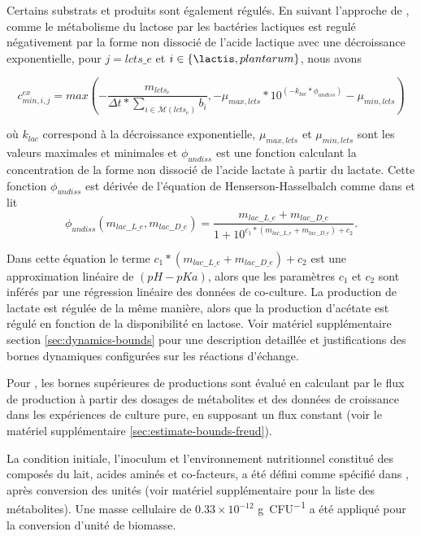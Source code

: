 \documentclass[../main.tex]{subfiles}
\begin{document}
Certains substrats et produits sont également régulés. En suivant l'approche de \citep{Ozcan.2020}, comme le métabolisme du lactose par les bactéries lactiques est regulé négativement par la forme non dissocié de l'acide lactique avec une décroissance exponentielle, pour $j=lcts\_e$ et $i \in \{\lactis, plantarum\}$, nous avons 

\[ c^{ex}_{min,i,j} = max(-\frac{m_{lcts_e}}{\Delta t*\sum_{i \in \mathcal{M}(lcts_e)} b_i},-\mu_{max,lcts}*10^{(-k_{lac}*\phi_{undiss})}-\mu_{min,lcts})\]  

où $k_{lac}$ correspond à la décroissance exponentielle, $\mu_{max,lcts}$ et $\mu_{min,lcts}$ sont les valeurs maximales et minimales et $\phi_{undiss}$ est une fonction calculant la concentration de la forme non dissocié de l'acide lactate à partir du lactate. Cette fonction $\phi_{undiss}$ est dérivée de l'équation de Henserson-Hasselbalch comme dans \citep{Ozcan.2020} et lit
\begin{equation}
\phi_{undiss}(m_{lac\_\_L\_e},m_{lac\_\_D\_e}) = \frac{m_{lac\_\_L\_e}+m_{lac\_\_D\_e}}{1+ 10^{c_1 * (m_{lac\_\_L\_e}+m_{lac\_\_D\_e})+c_2}}.
\label{eq:undissociated-lactate}
\end{equation}

Dans cette équation le terme $c_1 * (m_{lac\_\_L\_e}+m_{lac\_\_D\_e})+c_2$ est une approximation linéaire de $(pH-pKa)$, alors que les paramètres 
$c_1$ et $c_2$ sont inférés par une régression linéaire des données de co-culture. La production de lactate est régulée de la même manière, alors que la production d'acétate est régulé en fonction de la disponibilité en lactose. Voir matériel supplémentaire section \ref{sec:dynamics-bounds} pour une description detaillée et justifications des bornes dynamiques configurées sur les réactions d'échange.

Pour \freud, les bornes supérieures de productions sont évalué en calculant par le flux de production à partir des dosages de métabolites et des données de croissance dans les expériences de culture pure, en supposant un flux constant (voir le matériel supplémentaire \ref{sec:estimate-bounds-freud}).

La condition initiale, l'inoculum et l'environnement nutritionnel constitué des composés du lait, acides aminés et co-facteurs, a été défini comme spécifié dans \citep{Cao2021}, après conversion des unités (voir matériel supplémentaire pour la liste des métabolites). Une masse cellulaire de $0.33\times10^{-12}$ \unit{\gram \per CFU} a été appliqué pour la conversion d'unité de biomasse.
\end{document}
